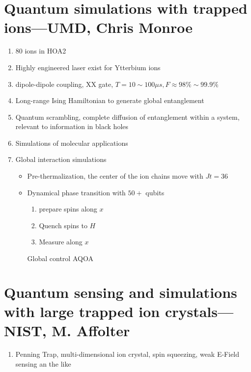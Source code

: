 \section{Quantum simulations with trapped ions---UMD, Chris Monroe} %
\label{sec:quantum_simulations_with_trapped_ions_umd_chris_monroe}


\begin{enumerate}
    \item $80$ ions in HOA2
    \item Highly engineered laser exist for Ytterbium ions
    \item dipole-dipole coupling, XX gate, $T=10\sim 100\mu s, F\approx 98\%\sim 99.9\%$
    \item Long-range Ising Hamiltonian to generate global entanglement
    \item Quantum scrambling, complete diffusion of entanglement within a system, relevant to information in black holes
    \item Simulations of molecular applications
    \item Global interaction simulations
    \begin{itemize}
        \item Pre-thermalization, the center of the ion chains move with $Jt=36$
        \item Dynamical phase transition with $50+$ qubits
        \begin{enumerate}
            \item prepare spins along $x$
            \item Quench spins to $H$
            \item Measure along $x$
        \end{enumerate}
        Global control AQOA
    \end{itemize}
\end{enumerate}



\section{Quantum sensing and simulations with large trapped ion crystals---NIST, M. Affolter} %
\label{sec:quantum_sensing_and_simulations_with_large_trapped_ion_crystals_nist_m_affolter}


\begin{enumerate}
    \item Penning Trap, multi-dimensional ion crystal, spin squeezing, weak E-Field sensing an the like
\end{enumerate}





